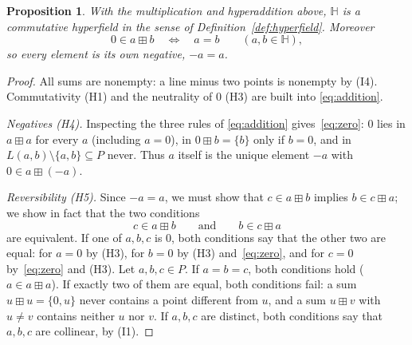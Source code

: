 \documentclass[11pt]{article}
\theoremstyle{plain}
\newtheorem{proposition}[theorem]{Proposition}
\theoremstyle{definition}
\newcommand{\Hh}{\mathbb{H}}
\newcommand{\bp}{\boxplus}
\begin{document}
\begin{proposition}\label{prop:hyperfield}
With the multiplication and hyperaddition above, $\Hh$ is a commutative
hyperfield in the sense of Definition~\ref{def:hyperfield}.  Moreover
\begin{equation}\label{eq:zero}
 0\in a\bp b\quad\Longleftrightarrow\quad a=b\qquad(a,b\in\Hh),
\end{equation}
so every element is its own negative, $-a=a$.
\end{proposition}
\begin{proof}
All sums are nonempty: a line minus two points is nonempty by (I4).
Commutativity (H1) and the neutrality of $0$ (H3) are built into
\eqref{eq:addition}.

\emph{Negatives (H4).}  Inspecting the three rules of
\eqref{eq:addition} gives~\eqref{eq:zero}: $0$ lies in $a\bp a$ for
every $a$ (including $a=0$), in $0\bp b=\{b\}$ only if $b=0$, and in
$L(a,b)\setminus\{a,b\}\subseteq P$ never.  Thus $a$ itself is the
unique element $-a$ with $0\in a\bp(-a)$.

\emph{Reversibility (H5).}  Since $-a=a$, we must show that
$c\in a\bp b$ implies $b\in c\bp a$; we show in fact that the two
conditions
\[
 c\in a\bp b\qquad\text{and}\qquad b\in c\bp a
\]
are equivalent.  If one of $a,b,c$ is $0$, both conditions say that the
other two are equal: for $a=0$ by (H3), for $b=0$ by (H3)
and~\eqref{eq:zero}, and for $c=0$ by~\eqref{eq:zero} and (H3).  Let
$a,b,c\in P$.  If $a=b=c$, both conditions hold ($a\in a\bp a$).  If
exactly two of them are equal, both conditions fail: a sum
$u\bp u=\{0,u\}$ never contains a point different from $u$, and a sum
$u\bp v$ with $u\neq v$ contains neither $u$ nor $v$.  If $a,b,c$ are
distinct, both conditions say that $a,b,c$ are collinear, by (I1).


\end{proof}
\end{document}
